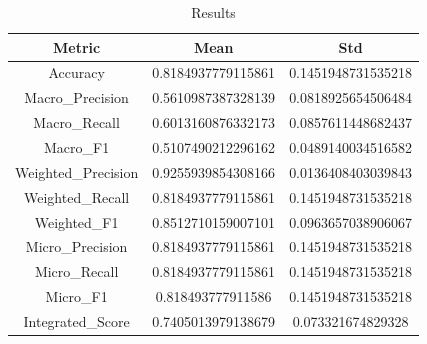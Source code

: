 \begin{table}[htbp]
\centering
\caption{Results}
\label{tab:csv}
\small
\setlength{\tabcolsep}{4pt}
\begin{tabular}{|c|c|c|}
\hline
Metric & Mean & Std \\
\hline
Accuracy & 0.8184937779115861 & 0.1451948731535218 \\
Macro_Precision & 0.5610987387328139 & 0.0818925654506484 \\
Macro_Recall & 0.6013160876332173 & 0.0857611448682437 \\
Macro_F1 & 0.5107490212296162 & 0.0489140034516582 \\
Weighted_Precision & 0.9255939854308166 & 0.0136408403039843 \\
Weighted_Recall & 0.8184937779115861 & 0.1451948731535218 \\
Weighted_F1 & 0.8512710159007101 & 0.0963657038906067 \\
Micro_Precision & 0.8184937779115861 & 0.1451948731535218 \\
Micro_Recall & 0.8184937779115861 & 0.1451948731535218 \\
Micro_F1 & 0.818493777911586 & 0.1451948731535218 \\
Integrated_Score & 0.7405013979138679 & 0.073321674829328 \\
\hline
\end{tabular}
\end{table}